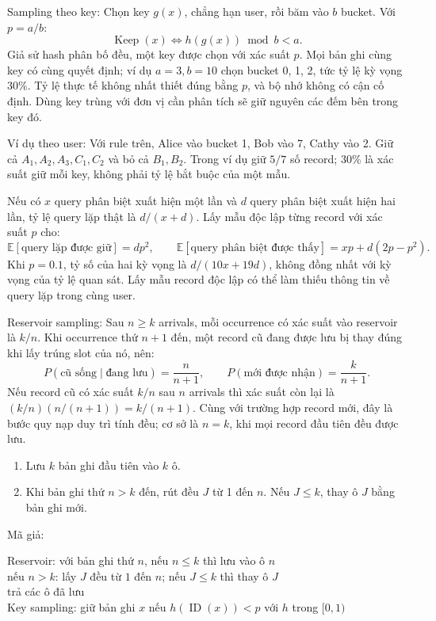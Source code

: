 \documentclass[10pt,a4paper,twocolumn]{article}
\makeatletter
\newcommand{\key}[1]{#1:\enspace}
\newcommand{\steps}[1]{\begin{enumerate}[label=\arabic*.,leftmargin=1.5em,itemsep=1pt,topsep=2pt]#1\end{enumerate}}
\newenvironment{algpseudo}{%
  \par\addvspace{2pt}\noindent
  \setlength{\parskip}{0pt}%
  Mã giả:\par\nobreak
  \begin{list}{}{\setlength{\leftmargin}{1em}\setlength{\topsep}{0pt}%
    \setlength{\partopsep}{0pt}\setlength{\parsep}{0pt}%
    \@beginparpenalty=10000\relax}%
  \item\relax
}{\end{list}\par\addvspace{3pt}}
\makeatother
\begin{document}
\key{Sampling theo key} Chọn key $g(x)$, chẳng hạn user, rồi băm vào $b$ bucket. Với $p=a/b$:
\[
\operatorname{Keep}(x)\iff h(g(x))\bmod b<a.
\]
Giả sử hash phân bố đều, một key được chọn với xác suất $p$. Mọi bản ghi cùng key có cùng quyết định; ví dụ $a=3,b=10$ chọn bucket 0, 1, 2, tức tỷ lệ kỳ vọng $30\%$. Tỷ lệ thực tế không nhất thiết đúng bằng $p$, và bộ nhớ không có cận cố định. Dùng key trùng với đơn vị cần phân tích sẽ giữ nguyên các đếm bên trong key đó.

\key{Ví dụ theo user} Với rule trên, Alice vào bucket 1, Bob vào 7, Cathy vào 2. Giữ cả $A_1,A_2,A_3,C_1,C_2$ và bỏ cả $B_1,B_2$. Trong ví dụ giữ $5/7$ số record; $30\%$ là xác suất giữ mỗi key, không phải tỷ lệ bắt buộc của một mẫu.

Nếu có $x$ query phân biệt xuất hiện một lần và $d$ query phân biệt xuất hiện hai lần, tỷ lệ query lặp thật là $d/(x+d)$. Lấy mẫu độc lập từng record với xác suất $p$ cho:
\[
\mathbb E[\text{query lặp được giữ}]=dp^2,\qquad
\mathbb E[\text{query phân biệt được thấy}]=xp+d(2p-p^2).
\]
Khi $p=0.1$, tỷ số của hai kỳ vọng là $d/(10x+19d)$, không đồng nhất với kỳ vọng của tỷ lệ quan sát. Lấy mẫu record độc lập có thể làm thiếu thông tin về query lặp trong cùng user.

\key{Reservoir sampling} Sau $n\ge k$ arrivals, mỗi occurrence có xác suất vào reservoir là $k/n$. Khi occurrence thứ $n+1$ đến, một record cũ đang được lưu bị thay đúng khi lấy trúng slot của nó, nên:
\[
P(\text{cũ sống}\mid\text{đang lưu})=\frac{n}{n+1},\qquad
P(\text{mới được nhận})=\frac{k}{n+1}.
\]
Nếu record cũ có xác suất $k/n$ sau $n$ arrivals thì xác suất còn lại là $(k/n)(n/(n+1))=k/(n+1)$. Cùng với trường hợp record mới, đây là bước quy nạp duy trì tính đều; cơ sở là $n=k$, khi mọi record đầu tiên đều được lưu.

\steps{
\item Lưu $k$ bản ghi đầu tiên vào $k$ ô.
\item Khi bản ghi thứ $n>k$ đến, rút đều $J$ từ 1 đến $n$. Nếu $J\le k$, thay ô $J$ bằng bản ghi mới.
}

\begin{algpseudo}
Reservoir: với bản ghi thứ $n$, nếu $n\le k$ thì lưu vào ô $n$\\
\quad nếu $n>k$: lấy $J$ đều từ $1$ đến $n$; nếu $J\le k$ thì thay ô $J$\\
\quad trả các ô đã lưu\\
Key sampling: giữ bản ghi $x$ nếu $h(\operatorname{ID}(x))<p$ với $h$ trong $[0,1)$
\end{algpseudo}
\end{document}
